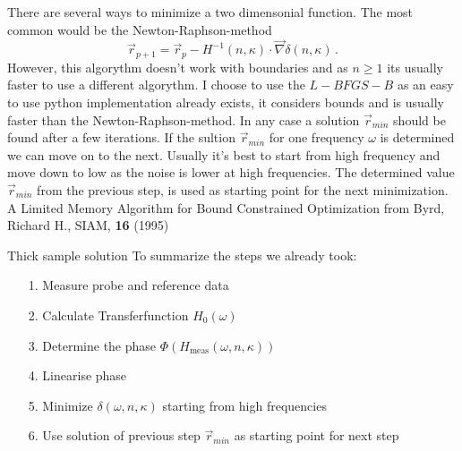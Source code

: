 \documentclass[aspectratio=1610, 9pt]{beamer}
\begin{document}
\begin{frame}
  There are several ways to minimize a two dimensonial function. The most common would be the Newton-Raphson-method
  \begin{equation}
    \vec{r}_{p + 1} = \vec{r}_{p} - H^{-1}(n,\kappa)\cdot\vec{\nabla}\delta(n, \kappa) \, .
  \end{equation}
  However, this algorythm doesn't work with boundaries and as $n \geq 1$ its usually faster to use a different algorythm.
  I choose to use the $L-BFGS-B$ as an easy to use python implementation already exists, it considers bounds and is usually faster than the Newton-Raphson-method.
  In any case a solution $\vec{r}_{min}$ should be found after a few iterations.
  If the sultion $\vec{r}_{min}$ for one frequency $\omega$ is determined  we can move on to the next.
  Usually it's best to start from high frequency and move down to low as the noise is lower at high frequencies.
  The determined value $\vec{r}_{min}$ from the previous step, is used as starting point for the next minimization.\\
  \textcolor{tugreen}{A Limited Memory Algorithm for Bound Constrained Optimization} from Byrd, Richard H., SIAM, \textbf{16} (1995)
\end{frame}

\begin{frame}{Thick sample solution}
  To summarize the steps we already took:
  \begin{itemize}
    \item[1.] Measure probe and reference data 
    \item[2.] Calculate Transferfunction $H_0(\omega)$
    \item[3.] Determine the phase $\Phi(H_\text{meas}(\omega, n, \kappa))$
    \item[4.] Linearise phase
    \item[5.] Minimize $\delta(\omega, n, \kappa)$ starting from high frequencies
    \item[6.] Use solution of previous step $\vec{r}_{min}$ as starting point for next step 
  \end{itemize}
\end{frame}
\end{document}
